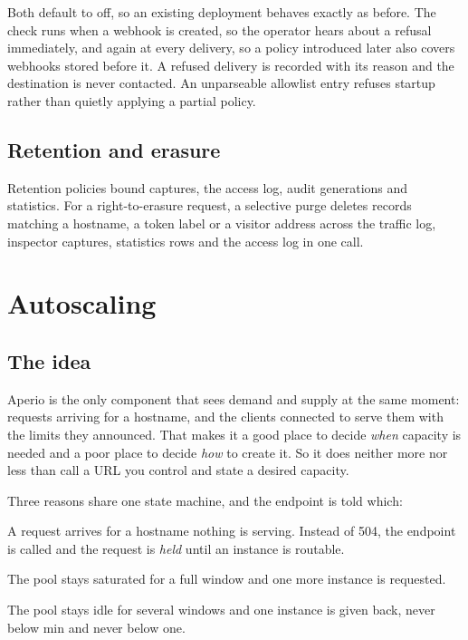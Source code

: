 \documentclass[11pt,a4paper,oneside]{book}
\newcommand{\aperiobreakableunderscore}{\textunderscore\allowbreak}
\newcommand{\aperiocodebreaks}{\XeTeXinterchartokenstate=1 }
\newcommand{\aperiocodebreaks}{}
\DeclareRobustCommand{\code}[1]{{\ttfamily\small\aperiocodebreaks
  \let\_\aperiobreakableunderscore#1}}
\begin{document}
Both default to off, so an existing deployment behaves exactly as before.
The check runs when a webhook is created, so the operator hears about a
refusal immediately, and again at every delivery, so a policy introduced
later also covers webhooks stored before it. A refused delivery is
recorded with its reason and the destination is never contacted. An
unparseable allowlist entry refuses startup rather than quietly applying a
partial policy.

\section{Retention and erasure}

Retention policies bound captures, the access log, audit generations and
statistics. For a right-to-erasure request, a selective purge deletes
records matching a hostname, a token label or a visitor address across
the traffic log, inspector captures, statistics rows and the access log
in one call.

\chapter{Autoscaling}
\label{ch:autoscaling}

\section{The idea}

Aperio is the only component that sees demand and supply at the same
moment: requests arriving for a hostname, and the clients connected to
serve them with the limits they announced. That makes it a good place to
decide \emph{when} capacity is needed and a poor place to decide
\emph{how} to create it. So it does neither more nor less than call a URL
you control and state a desired capacity.

Three reasons share one state machine, and the endpoint is told which:

\begin{description}[leftmargin=1.6em,style=nextline]
  \item[\code{cold\_start}, 0 to 1] A request arrives for a hostname
        nothing is serving. Instead of \code{504}, the endpoint is called
        and the request is \emph{held} until an instance is routable.
  \item[\code{scale\_out}, N to N+1] The pool stays saturated for a full
        window and one more instance is requested.
  \item[\code{scale\_in}, N to N-1] The pool stays idle for several
        windows and one instance is given back, never below \code{min}
        and never below one.
\end{description}
\end{document}
